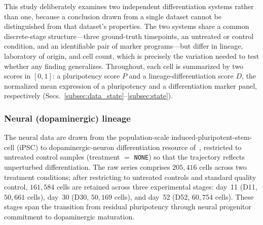 \documentclass[pdflatex,sn-mathphys-num]{sn-jnl}
\theoremstyle{thmstyleone}%
\theoremstyle{thmstyletwo}%
\theoremstyle{thmstylethree}%
\begin{document}
This study deliberately examines two independent differentiation systems rather than one, because a conclusion drawn from a single dataset cannot be distinguished from that dataset's properties. The two systems share a common discrete-stage structure---three ground-truth timepoints, an untreated or control condition, and an identifiable pair of marker programs---but differ in lineage, laboratory of origin, and cell count, which is precisely the variation needed to test whether any finding generalizes. Throughout, each cell is summarized by two scores in $[0,1]$: a pluripotency score $P$ and a lineage-differentiation score $D$, the normalized mean expression of a pluripotency and a differentiation marker panel, respectively (Secs.~\ref{subsec:data_state}--\ref{subsec:state}).

\subsubsection{Neural (dopaminergic) lineage} The neural data are drawn from the population-scale induced-pluripotent-stem-cell (iPSC) to dopaminergic-neuron differentiation resource of~\cite{jerber2021population}, restricted to untreated control samples (treatment $=$ \texttt{NONE}) so that the trajectory reflects unperturbed differentiation. The raw series comprises $205{,}416$ cells across two treatment conditions; after restricting to untreated controls and standard quality control, $161{,}584$ cells are retained across three experimental stages: day~11 (D11, $50{,}661$ cells), day~30 (D30, $50{,}169$ cells), and day~52 (D52, $60{,}754$ cells). These stages span the transition from residual pluripotency through neural progenitor commitment to dopaminergic maturation.
\end{document}
